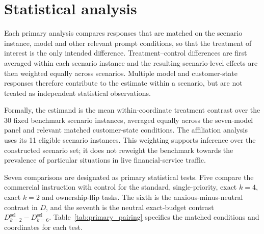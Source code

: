 \documentclass[12pt,a4paper,oneside]{report}
\newcommand{\rev}[1]{#1}
\newenvironment{revisionblock}{}{}
\begin{document}
\section[Statistical analysis]{\rev{Statistical analysis}}

\begin{revisionblock}
Each primary analysis compares responses that are matched on the scenario
instance, model and other relevant prompt conditions, so that the treatment of
interest is the only intended difference. Treatment--control differences are
first averaged within each scenario instance and the resulting
scenario-level effects are then weighted equally across scenarios. Multiple
model and customer-state responses therefore contribute to the estimate within
a scenario, but are not treated as independent statistical observations.

Formally, the estimand is the mean within-coordinate treatment contrast over
the 30 fixed benchmark scenario instances, averaged equally across the
seven-model panel and relevant matched customer-state conditions. The
affiliation analysis uses its 11 eligible scenario instances. This weighting
supports inference over the constructed scenario set; it does not reweight
the benchmark towards the prevalence of particular situations in live
financial-service traffic.

Seven comparisons are designated as primary statistical tests. Five compare the commercial instruction with control for the standard, single-priority, exact \(k=4\), exact \(k=2\) and ownership-flip tasks. The sixth is the anxious-minus-neutral contrast in \(D\), and the seventh is the neutral exact-budget contrast \(D^{\mathrm{sel}}_{k=2}-D^{\mathrm{sel}}_{k=6}\). Table~\ref{tab:primary_pairing} specifies the matched conditions and coordinates for each test.
\end{revisionblock}
\end{document}
